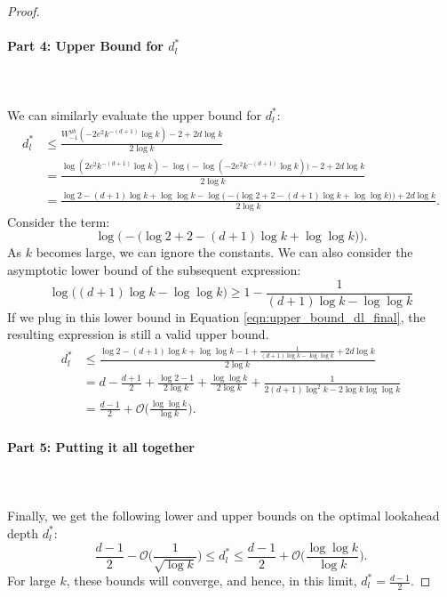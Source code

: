 \begin{proof}
\paragraph{Part 4: Upper Bound for $d^*_l$}\leavevmode\leavevmode\\\\
We can similarly evaluate the upper bound for $d_l^*$: 
\begin{align}
    d^*_l &\leq \frac{W_{-1}^{ub}(-2e^2k^{-\left(d+1\right)}\log k) - 2+2d\log k}{2\log k}\\
    &= \frac{\log\left(2e^2k^{-\left(d+1\right)}\log k\right) - \log\Big(-\log\left(-2e^2k^{-\left(d+1\right)}\log k\right)\Big) - 2 + 2d\log k}{2\log k}\\
    \label{eqn:upper_bound_dl_final}
    &= \frac{\log 2 - (d+1)\log k + \log \log k - \log\Big(-\big(\log 2 + 2 - \left(d+1\right)\log k + \log \log k\big)\Big) + 2d \log k}{2\log k}.
\end{align}
Consider the term: 
\begin{equation}
    \log\Big(-\big(\log 2 + 2 - \left(d+1\right)\log k + \log \log k\big)\Big).
\end{equation}
As $k$ becomes large, we can ignore the constants. 
We can also consider the asymptotic lower bound of the subsequent expression:
\begin{equation}
    \log\Big(\left(d+1\right)\log k - \log \log k\Big) \geq 1 - \frac{1}{\left(d+1\right)\log k - \log \log k}
\end{equation}
If we plug in this lower bound in Equation \ref{eqn:upper_bound_dl_final}, the resulting expression is still a valid upper bound. 
\begin{align}
    d_l^* &\leq \frac{\log 2 -(d+1)\log k + \log \log k -1 + \frac{1}{\left(d+1\right)\log k - \log \log k} + 2d\log k}{2\log k}\\
    &=d - \frac{d+1}{2} + \frac{\log 2 - 1}{2\log k} + \frac{\log \log k}{2 \log k} + \frac{1}{2(d+1)\log^2 k - 2\log k \log \log k}\\
    &= \frac{d-1}{2} + \mathcal{O}\Big(\frac{\log \log k}{\log k}\Big).
\end{align}
\paragraph{Part 5: Putting it all together}\leavevmode\leavevmode\\\\
Finally, we get the following lower and upper bounds on the optimal lookahead depth $d_l^*$: 
\begin{equation}
    \frac{d-1}{2} - \mathcal{O}\Big(\frac{1}{\sqrt{\log k}}\Big) \leq d_l^* \leq \frac{d-1}{2} + \mathcal{O}\Big(\frac{\log \log k}{\log k}\Big).
\end{equation}
For large $k$, these bounds will converge, and hence, in this limit, $d_l^* = \frac{d-1}{2}$.

\end{proof}
